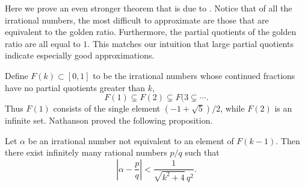 Here we prove an even stronger theorem that is due to {\Nathanson}
\cite{Nathanson74}.  Notice that of all the irrational numbers,  the
most difficult to approximate are those that are equivalent to the
golden ratio.  Furthermore, the partial quotients of the golden ratio
are all equal to $1$.  This matches our intuition that large partial
quotients indicate especially good approximations.

Define $F(k) \subset [0, 1]$ to be the irrational numbers whose
continued fractions have no partial quotients greater than $k$,
\[
F(1) \varsubsetneq F(2) \varsubsetneq F(3  \varsubsetneq  \cdots.
\]
Thus $F(1)$ consists of the single element $(-1 + \sqrt{5})/2$, while
$F(2)$ is an infinite set.  Nathanson proved the following
proposition.

\begin{proposition}[Nathanson] \label{Nathanson:Prop}
Let $\alpha$ be an irrational number not equivalent to an element of
$F(k-1)$.  Then there exist infinitely many rational numbers $p/q$ such
that
\[
\left|\alpha - \frac{p}{q}\right| < \frac{1}{\sqrt{k^2 + 4} \, q^2}.
\]
\end{proposition}


